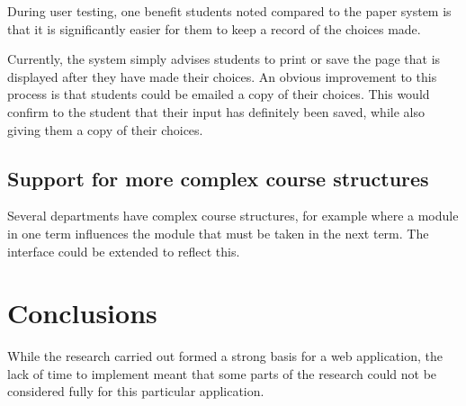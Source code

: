 \documentclass[draft]{scrartcl}
\begin{document}
During user testing, one benefit students noted compared to the paper system
is that it is significantly easier for them to keep a record of the choices
made.

Currently, the system simply advises students to print or save the page that
is displayed after they have made their choices. An obvious improvement to
this process is that students could be emailed a copy of their choices. This
would confirm to the student that their input has definitely been saved, while
also giving them a copy of their choices.

\subsection{Support for more complex course structures}

Several departments have complex course structures, for example where a module
in one term influences the module that must be taken in the next term. The
interface could be extended to reflect this.

\section{Conclusions}
\label{sec:conclusions}





While the research carried out formed a strong basis for a web application,
the lack of time to implement meant that some parts of the research could not
be considered fully for this particular application.
\end{document}
